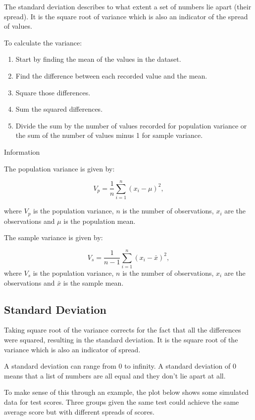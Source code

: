 \documentclass[
]{book}
\providecommand{\tightlist}{%
  \setlength{\itemsep}{0pt}\setlength{\parskip}{0pt}}
\begin{document}
The standard deviation describes to what extent a set of numbers lie apart (their spread). It is the square root of variance which is also an indicator of the spread of values.

To calculate the variance:

\begin{enumerate}
\def\labelenumi{\arabic{enumi}.}
\tightlist
\item
  Start by finding the mean of the values in the dataset.
\item
  Find the difference between each recorded value and the mean.
\item
  Square those differences.
\item
  Sum the squared differences.
\item
  Divide the sum by the number of values recorded for population variance or the sum of the number of values minus 1 for sample variance.
\end{enumerate}

Information

The population variance is given by:

\[V_{p} = \frac{1}{n}\sum_{i=1}^n (x_i - \mu)^2,\]

where \(V_p\) is the population variance, \(n\) is the number of observations, \(x_i\) are the observations and \(\mu\) is the population mean.

The sample variance is given by:

\[V_{s} = \frac{1}{n-1}\sum_{i=1}^n (x_i - \bar{x})^2,\]
where \(V_s\) is the population variance, \(n\) is the number of observations, \(x_i\) are the observations and \(\bar{x}\) is the sample mean.

\hypertarget{stdv}{%
\subsection{Standard Deviation}\label{stdv}}

Taking square root of the variance corrects for the fact that all the differences were squared, resulting in the standard deviation. It is the square root of the variance which is also an indicator of spread.

A standard deviation can range from 0 to infinity. A standard deviation of 0 means that a list of numbers are all equal and they don't lie apart at all.

To make sense of this through an example, the plot below shows some simulated data for test scores. Three groups given the same test could achieve the same average score but with different spreads of scores.
\end{document}
